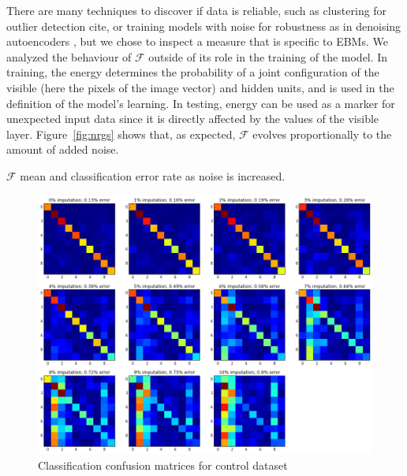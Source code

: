 \documentclass{report}
\begin{document}
There are many techniques to discover if data is reliable, such as clustering for outlier detection cite{}, or training models with noise for robustness as in denoising autoencoders \cite{Vincent}, but we chose to inspect a measure that is specific to EBMs. We analyzed the behaviour of $\mathcal{F}$ outside of its role in the training of the model. In training, the energy determines the probability of a joint configuration of the visible (here the pixels of the image vector) and hidden units, and is used in the definition of the model's learning. In testing, energy can be used as a marker for unexpected input data since it is directly affected by the values of the visible layer. Figure~\ref{fig:nrgs} shows that, as expected, $\mathcal{F}$ evolves proportionally to the amount of added noise. 

\begin{table}
	\begin{center}
	\end{center}
	\caption{$\mathcal{F}$ mean and classification error rate as noise is increased.}
	\label{table:control}
\end{table}

\begin{figure}
\begin{center}
	\includegraphics[width=\textwidth]{confusion_matrices}
	\caption{Classification confusion matrices for control dataset}
	\label{fig:CM}
\end{center}
\end{figure}
\end{document}
